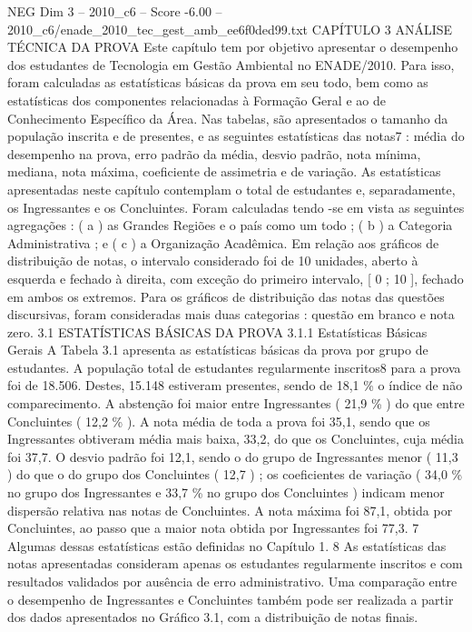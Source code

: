 \begin{textsample}{NEG Dim 3 – 2010\_c6 – Score -6.00 – 2010\_c6/enade\_2010\_tec\_gest\_amb\_ee6f0ded99.txt}  \label{ex:f3_neg_019}
CAPÍTULO 3 ANÁLISE TÉCNICA DA PROVA Este capítulo tem por objetivo apresentar o desempenho dos estudantes de Tecnologia em Gestão Ambiental no ENADE/2010.
Para isso, foram calculadas as estatísticas básicas da prova em seu todo, bem como as estatísticas dos componentes relacionadas à Formação Geral e ao de Conhecimento Específico da Área.
Nas tabelas, são apresentados o tamanho da população inscrita e de presentes, e as seguintes estatísticas das notas7 : média do desempenho na prova, erro padrão da média, desvio padrão, nota mínima, mediana, nota máxima, coeficiente de assimetria e de variação.
As estatísticas apresentadas neste capítulo contemplam o total de estudantes e, separadamente, os Ingressantes e os Concluintes.
Foram calculadas tendo -se em vista as seguintes agregações : ( a ) as Grandes Regiões e o país como um todo ; ( b ) a Categoria Administrativa ; e ( c ) a Organização Acadêmica.
Em relação aos gráficos de distribuição de notas, o intervalo considerado foi de 10 unidades, aberto à esquerda e fechado à direita, com exceção do primeiro intervalo, [ 0 ; 10 ], fechado em ambos os extremos.
Para os gráficos de distribuição das notas das questões discursivas, foram consideradas mais duas categorias : questão em branco e nota zero. 3.1 ESTATÍSTICAS BÁSICAS DA PROVA 3.1.1 Estatísticas Básicas Gerais A Tabela 3.1 apresenta as estatísticas básicas da prova por grupo de estudantes.
A população total de estudantes regularmente inscritos8 para a prova foi de 18.506.
Destes, 15.148 estiveram presentes, sendo de 18,1 \% o índice de não comparecimento.
A abstenção foi maior entre Ingressantes ( 21,9 \% ) do que entre Concluintes ( 12,2 \% ).
A nota média de toda a prova foi 35,1, sendo que os Ingressantes obtiveram média mais baixa, 33,2, do que os Concluintes, cuja média foi 37,7.
O desvio padrão foi 12,1, sendo o do grupo de Ingressantes menor ( 11,3 ) do que o do grupo dos Concluintes ( 12,7 ) ; os coeficientes de variação ( 34,0 \% no grupo dos Ingressantes e 33,7 \% no grupo dos Concluintes ) indicam menor dispersão relativa nas notas de Concluintes.
A nota máxima foi 87,1, obtida por Concluintes, ao passo que a maior nota obtida por Ingressantes foi 77,3. 7 Algumas dessas estatísticas estão definidas no Capítulo 1. 8 As estatísticas das notas apresentadas consideram apenas os estudantes regularmente inscritos e com resultados validados por ausência de erro administrativo.
Uma comparação entre o desempenho de Ingressantes e Concluintes também pode ser realizada a partir dos dados apresentados no Gráfico 3.1, com a distribuição de notas finais.

\end{textsample}
